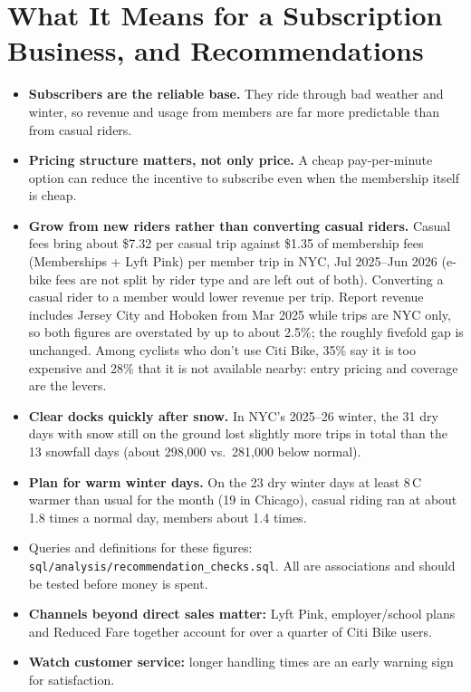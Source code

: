 \documentclass[11pt,a4paper]{article}
\begin{document}
\section{What It Means for a Subscription Business, and Recommendations}
\begin{itemize}
\item \textbf{Subscribers are the reliable base.} They ride through bad weather and winter, so revenue and usage from members are far more predictable than from casual riders.
\item \textbf{Pricing structure matters, not only price.} A cheap pay-per-minute option can reduce the incentive to subscribe even when the membership itself is cheap.
\item \textbf{Grow from new riders rather than converting casual riders.} Casual fees bring about \$7.32 per casual trip against \$1.35 of membership fees (Memberships + Lyft Pink) per member trip in NYC, Jul 2025--Jun 2026 (e-bike fees are not split by rider type and are left out of both). Converting a casual rider to a member would lower revenue per trip. Report revenue includes Jersey City and Hoboken from Mar 2025 while trips are NYC only, so both figures are overstated by up to about 2.5\%; the roughly fivefold gap is unchanged. Among cyclists who don't use Citi Bike, 35\% say it is too expensive and 28\% that it is not available nearby: entry pricing and coverage are the levers.
\item \textbf{Clear docks quickly after snow.} In NYC's 2025--26 winter, the 31 dry days with snow still on the ground lost slightly more trips in total than the 13 snowfall days (about 298,000 vs.\ 281,000 below normal).
\item \textbf{Plan for warm winter days.} On the 23 dry winter days at least 8\,\textdegree C warmer than usual for the month (19 in Chicago), casual riding ran at about 1.8 times a normal day, members about 1.4 times.
\item Queries and definitions for these figures: \texttt{sql/analysis/recommendation\_checks.sql}. All are associations and should be tested before money is spent.
\item \textbf{Channels beyond direct sales matter:} Lyft Pink, employer/school plans and Reduced Fare together account for over a quarter of Citi Bike users.
\item \textbf{Watch customer service:} longer handling times are an early warning sign for satisfaction.
\end{itemize}
\end{document}
